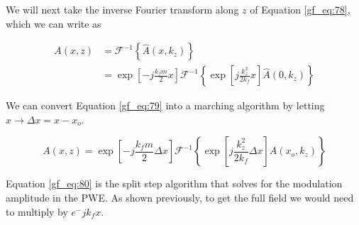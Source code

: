 We will next take the inverse Fourier transform along $z$ of Equation \ref{gf_eq:78}, which we can write as

\begin{equation}
\begin{aligned}
A(x,z) &= \mathcal{F}^{-1}\left\{\hat{A}(x,k_z) \right\} \\
&= \exp\left[-j\frac{k_fm}{2}x\right]\mathcal{F}^{-1}\left\{\exp\left[j\frac{k_z^2}{2k_f}x \right]\hat{A}(0,k_z) \right\}
\end{aligned}
\label{gf_eq:79}
\end{equation}
\renewcommand{\baselinestretch}{2} \small\normalsize

\noindent We can convert Equation \ref{gf_eq:79} into a marching algorithm by letting $x\rightarrow \Delta x = x-x_o$.

\begin{equation}
\boxed{A(x,z) = \exp\left[-j\frac{k_fm}{2}\Delta x\right]\mathcal{F}^{-1}\left\{\exp\left[j\frac{k_z^2}{2k_f}\Delta x \right]\hat{A}(x_o,k_z) \right\}}
\label{gf_eq:80}
\end{equation}
\renewcommand{\baselinestretch}{2} \small\normalsize

Equation \ref{gf_eq:80} is the split step algorithm that solves for the modulation amplitude in the PWE. As shown previously, to get the full field we would need to multiply by $e^-jk_fx$.